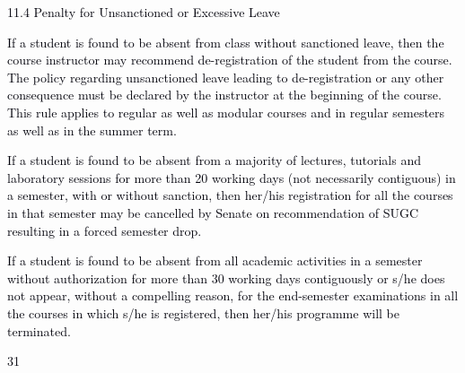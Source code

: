 \documentclass[12pt]{article}
\begin{document}
\vspace{\baselineskip}
\textcolor[HTML]{00000A}{11.4 Penalty for Unsanctioned or Excessive Leave}\par


\vspace{\baselineskip}
\begin{justify}
{\fontsize{10pt}{12.0pt}\selectfont \textcolor[HTML]{00000A}{If a student is found to be absent from class without sanctioned leave, then the course instructor may recommend de-registration of the student from the course. The policy regarding unsanctioned leave leading to de-registration or any other consequence must be declared by the instructor at the beginning of the course. This rule applies to regular as well as modular courses and in regular semesters as well as in the summer term.}\par}
\end{justify}\par


\vspace{\baselineskip}
\begin{justify}
{\fontsize{9pt}{10.8pt}\selectfont \textcolor[HTML]{00000A}{If a student is found to be absent from a majority of lectures, tutorials and laboratory sessions for more than 20 working days (not necessarily contiguous) in a semester, with or without sanction, then her/his registration for all the courses in that semester may be cancelled by Senate on recommendation of SUGC resulting in a forced semester drop.}\par}
\end{justify}\par


\vspace{\baselineskip}
\begin{justify}
{\fontsize{10pt}{12.0pt}\selectfont \textcolor[HTML]{00000A}{If a student is found to be absent from all academic activities in a semester without authorization for more than 30 working days contiguously or s/he does not appear, without a compelling reason, for the end-semester examinations in all the courses in which s/he is registered, then her/his programme will be terminated.}\par}
\end{justify}\par


\vspace{\baselineskip}
\begin{Center}
\textcolor[HTML]{00000A}{31}
\end{Center}\par
\end{document}
